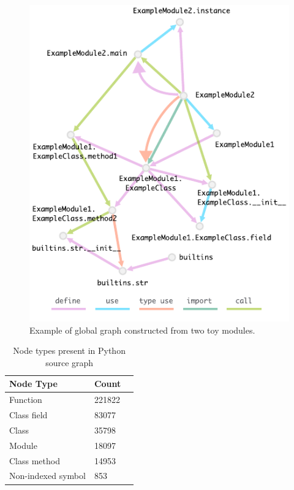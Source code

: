 \documentclass[a4paper,twoside]{article}
\begin{document}
\begin{figure}
    \centering
    \includegraphics{python_graph_example.pdf}
    \caption{Example of global graph constructed from two toy modules.}\label{fig:python_graph}
\end{figure}

\begin{table}[]
\centering
\begin{tabular}{lll}
    \toprule
    \textbf{Node Type}        & \textbf{Count}  \\ \midrule
    Function        & 221822 \\ \midrule
    Class field     & 83077 \\ \midrule
    Class           & 35798 \\ \midrule
    Module          & 18097 \\ \midrule
    Class method    & 14953 \\ \midrule
    Non-indexed symbol  & 853  \\ \bottomrule
\end{tabular}
\caption{Node types present in Python source graph\label{tbl:python_node_count}}
\end{table}
\end{document}
